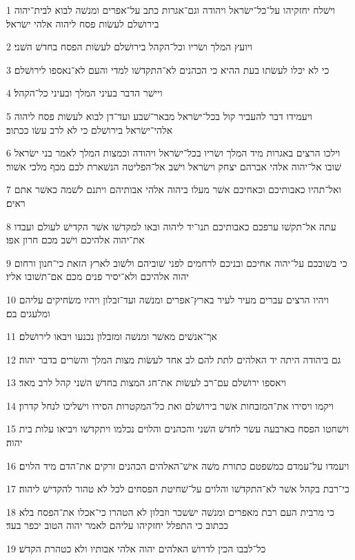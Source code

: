 \par 1 וישׁלח יחזקיהו על־כל־ישׂראל ויהודה וגם־אגרות כתב על־אפרים ומנשׁה לבוא לבית־יהוה בירושׁלם לעשׂות פסח ליהוה אלהי ישׂראל׃
\par 2 ויועץ המלך ושׂריו וכל־הקהל בירושׁלם לעשׂות הפסח בחדשׁ השׁני׃
\par 3 כי לא יכלו לעשׂתו בעת ההיא כי הכהנים לא־התקדשׁו למדי והעם לא־נאספו לירושׁלם׃
\par 4 ויישׁר הדבר בעיני המלך ובעיני כל־הקהל׃
\par 5 ויעמידו דבר להעביר קול בכל־ישׂראל מבאר־שׁבע ועד־דן לבוא לעשׂות פסח ליהוה אלהי־ישׂראל בירושׁלם כי לא לרב עשׂו ככתוב׃
\par 6 וילכו הרצים באגרות מיד המלך ושׂריו בכל־ישׂראל ויהודה וכמצות המלך לאמר בני ישׂראל שׁובו אל־יהוה אלהי אברהם יצחק וישׂראל וישׁב אל־הפליטה הנשׁארת לכם מכף מלכי אשׁור׃
\par 7 ואל־תהיו כאבותיכם וכאחיכם אשׁר מעלו ביהוה אלהי אבותיהם ויתנם לשׁמה כאשׁר אתם ראים׃
\par 8 עתה אל־תקשׁו ערפכם כאבותיכם תנו־יד ליהוה ובאו למקדשׁו אשׁר הקדישׁ לעולם ועבדו את־יהוה אלהיכם וישׁב מכם חרון אפו׃
\par 9 כי בשׁובכם על־יהוה אחיכם ובניכם לרחמים לפני שׁוביהם ולשׁוב לארץ הזאת כי־חנון ורחום יהוה אלהיכם ולא־יסיר פנים מכם אם־תשׁובו אליו׃
\par 10 ויהיו הרצים עברים מעיר לעיר בארץ־אפרים ומנשׁה ועד־זבלון ויהיו משׂחיקים עליהם ומלעגים בם׃
\par 11 אך־אנשׁים מאשׁר ומנשׁה ומזבלון נכנעו ויבאו לירושׁלם׃
\par 12 גם ביהודה היתה יד האלהים לתת להם לב אחד לעשׂות מצות המלך והשׂרים בדבר יהוה׃
\par 13 ויאספו ירושׁלם עם־רב לעשׂות את־חג המצות בחדשׁ השׁני קהל לרב מאד׃
\par 14 ויקמו ויסירו את־המזבחות אשׁר בירושׁלם ואת כל־המקטרות הסירו וישׁליכו לנחל קדרון׃
\par 15 וישׁחטו הפסח בארבעה עשׂר לחדשׁ השׁני והכהנים והלוים נכלמו ויתקדשׁו ויביאו עלות בית יהוה׃
\par 16 ויעמדו על־עמדם כמשׁפטם כתורת משׁה אישׁ־האלהים הכהנים זרקים את־הדם מיד הלוים׃
\par 17 כי־רבת בקהל אשׁר לא־התקדשׁו והלוים על־שׁחיטת הפסחים לכל לא טהור להקדישׁ ליהוה׃
\par 18 כי מרבית העם רבת מאפרים ומנשׁה ישׂשכר וזבלון לא הטהרו כי־אכלו את־הפסח בלא ככתוב כי התפלל יחזקיהו עליהם לאמר יהוה הטוב יכפר בעד׃
\par 19 כל־לבבו הכין לדרושׁ האלהים יהוה אלהי אבותיו ולא כטהרת הקדשׁ׃
